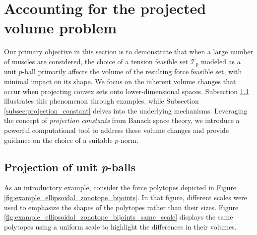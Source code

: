 \section{Accounting for the projected volume problem}
\label{sec:projected_volume_problem}
Our primary objective in this section is to demonstrate that when a large number of muscles are considered, the choice of a tension feasible set $\mathcal{T}_p$ modeled as a unit $p$-ball primarily affects the volume of the resulting force feasible set, with minimal impact on its shape. We focus on the inherent volume changes that occur when projecting convex sets onto lower-dimensional spaces. Subsection \ref{subsec:proj_unit_p_ball} illustrates this phenomenon through examples, while Subsection \ref{subsec:projection_constant} delves into the underlying mechanisms.  Leveraging the concept of \emph{projection constants} from Banach space theory, we introduce a powerful computational tool to address these volume changes and provide guidance on the choice of a suitable $p$-norm.

\subsection{Projection of unit \emph{p}-balls}
\label{subsec:proj_unit_p_ball}
As an introductory example, consider the force polytopes depicted in Figure \ref{fig:example_ellipsoidal_zonotope_bijoints}. In that figure, different scales were used to emphasize the shapes of the polytopes rather than their sizes.  Figure \ref{fig:example_ellipsoidal_zonotope_bijoints_same_scale} displays the same polytopes using a uniform scale to highlight the differences in their volumes.

